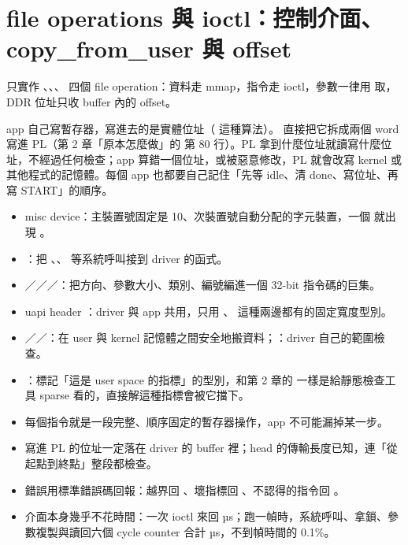 \section{file operations 與 ioctl：控制介面、copy\_from\_user 與 offset}
\label{sec:ioctl}

\begin{oneline}
 只實作 、、、 四個 file operation：資料走 mmap，指令走 ioctl，參數一律用  取，DDR 位址只收 buffer 內的 offset。
\end{oneline}

\begin{before}
app 自己寫暫存器，寫進去的是實體位址（ 這種算法）。 直接把它拆成兩個 word 寫進 PL（第 2 章「原本怎麼做」的  第 80 行）。PL 拿到什麼位址就讀寫什麼位址，不經過任何檢查；app 算錯一個位址，或被惡意修改，PL 就會改寫 kernel 或其他程式的記憶體。每個 app 也都要自己記住「先等 idle、清 done、寫位址、再寫 START」的順序。
\end{before}

\begin{tech}
\begin{itemize}
\item misc device：主裝置號固定是 10、次裝置號自動分配的字元裝置，一個  就出現 。
\item {}：把 、、 等系統呼叫接到 driver 的函式。
\item {}／／／：把方向、參數大小、類別、編號編進一個 32-bit 指令碼的巨集。
\item uapi header ：driver 與 app 共用，只用 、 這種兩邊都有的固定寬度型別。
\item {}／／：在 user 與 kernel 記憶體之間安全地搬資料；：driver 自己的範圍檢查。
\item {}：標記「這是 user space 的指標」的型別，和第 2 章的  一樣是給靜態檢查工具 sparse 看的，直接解這種指標會被它擋下。
\end{itemize}
\end{tech}

\begin{gain}
\begin{itemize}
\item 每個指令就是一段完整、順序固定的暫存器操作，app 不可能漏掉某一步。
\item 寫進 PL 的位址一定落在 driver 的 buffer 裡；head 的傳輸長度已知，連「從起點到終點」整段都檢查。
\item 錯誤用標準錯誤碼回報：越界回 、壞指標回 、不認得的指令回 。
\item 介面本身幾乎不花時間：一次 ioctl 來回 \ioctlUs{} µs；跑一幀時，系統呼叫、拿鎖、參數複製與讀回六個 cycle counter 合計 \bbSysUs{} µs，不到幀時間的 0.1\%。
\end{itemize}
\end{gain}

